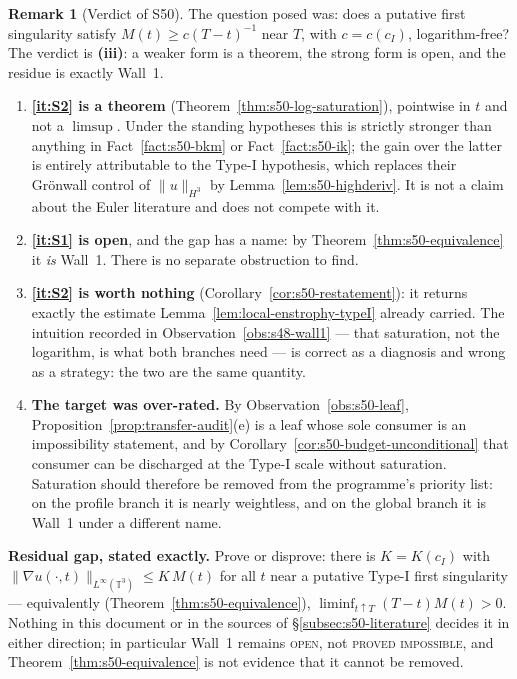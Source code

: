 \documentclass[11pt]{article}
\theoremstyle{definition}
\newtheorem{remark}[theorem]{Remark}
\theoremstyle{remark}
\newcommand{\T}{\mathbb{T}}
\begin{document}
\begin{remark}[Verdict of S50]\label{rem:s50-verdict}
  The question posed was: does a putative first singularity satisfy
  $M(t)\geq c(T-t)^{-1}$ near $T$, with $c=c(c_I)$, logarithm-free? The
  verdict is \textbf{(iii)}: a weaker form is a theorem, the strong form is
  open, and the residue is exactly Wall~1.
  \begin{enumerate}[label=\textup{(\arabic*)},leftmargin=2.4em]
  \item \textbf{\ref{it:S2} is a theorem}
    (Theorem~\ref{thm:s50-log-saturation}), pointwise in $t$ and not a
    $\limsup$. Under the standing hypotheses this is strictly stronger than
    anything in Fact~\ref{fact:s50-bkm} or Fact~\ref{fact:s50-ik}; the gain
    over the latter is entirely attributable to the Type-I hypothesis, which
    replaces their Gr\"onwall control of $\|u\|_{H^3}$ by
    Lemma~\ref{lem:s50-highderiv}. It is not a claim about the Euler
    literature and does not compete with it.
  \item \textbf{\ref{it:S1} is open}, and the gap has a name:
    by Theorem~\ref{thm:s50-equivalence} it \emph{is} Wall~1. There is no
    separate obstruction to find.
  \item \textbf{\ref{it:S2} is worth nothing}
    (Corollary~\ref{cor:s50-restatement}): it returns exactly the estimate
    Lemma~\ref{lem:local-enstrophy-typeI} already carried. The intuition
    recorded in Observation~\ref{obs:s48-wall1} --- that saturation, not the
    logarithm, is what both branches need --- is correct as a diagnosis and
    wrong as a strategy: the two are the same quantity.
  \item \textbf{The target was over-rated.} By
    Observation~\ref{obs:s50-leaf}, Proposition~\ref{prop:transfer-audit}(e)
    is a leaf whose sole consumer is an impossibility statement, and by
    Corollary~\ref{cor:s50-budget-unconditional} that consumer can be
    discharged at the Type-I scale without saturation. Saturation should
    therefore be removed from the programme's priority list: on the profile
    branch it is nearly weightless, and on the global branch it is Wall~1
    under a different name.
  \end{enumerate}
  \noindent\textbf{Residual gap, stated exactly.} Prove or disprove: there is
  $K=K(c_I)$ with $\|\nabla u(\cdot,t)\|_{L^\infty(\T^3)}\leq K\,M(t)$ for all
  $t$ near a putative Type-I first singularity --- equivalently
  (Theorem~\ref{thm:s50-equivalence}), $\liminf_{t\uparrow T}(T-t)M(t)>0$.
  Nothing in this document or in the sources of
  §\ref{subsec:s50-literature} decides it in either direction; in particular
  Wall~1 remains \textsc{open}, not \textsc{proved impossible}, and
  Theorem~\ref{thm:s50-equivalence} is not evidence that it cannot be removed.
\end{remark}
\end{document}
